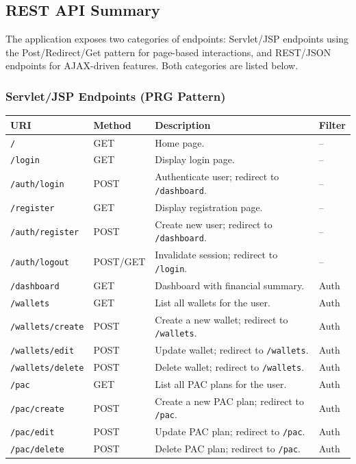 \subsection{REST API Summary}

The application exposes two categories of endpoints: Servlet/JSP endpoints using the Post/Redirect/Get pattern for page-based interactions, and REST/JSON endpoints for AJAX-driven features. Both categories are listed below.

\subsubsection*{Servlet/JSP Endpoints (PRG Pattern)}

\begin{longtable}{|p{}|p{} |p{}|p{}|}
\hline
\textbf{URI} & \textbf{Method} & \textbf{Description} & \textbf{Filter} \\\hline

\texttt{/} & GET & Home page. & -- \\\hline
\texttt{/login} & GET & Display login page. & -- \\\hline
\texttt{/auth/login} & POST & Authenticate user; redirect to \texttt{/dashboard}. & -- \\\hline
\texttt{/register} & GET & Display registration page. & -- \\\hline
\texttt{/auth/register} & POST & Create new user; redirect to \texttt{/dashboard}. & -- \\\hline
\texttt{/auth/logout} & POST/GET & Invalidate session; redirect to \texttt{/login}. & -- \\\hline

\texttt{/dashboard} & GET & Dashboard with financial summary. & Auth \\\hline

\texttt{/wallets} & GET & List all wallets for the user. & Auth \\\hline
\texttt{/wallets/create} & POST & Create a new wallet; redirect to \texttt{/wallets}. & Auth \\\hline
\texttt{/wallets/edit} & POST & Update wallet; redirect to \texttt{/wallets}. & Auth \\\hline
\texttt{/wallets/delete} & POST & Delete wallet; redirect to \texttt{/wallets}. & Auth \\\hline

\texttt{/pac} & GET & List all PAC plans for the user. & Auth \\\hline
\texttt{/pac/create} & POST & Create a new PAC plan; redirect to \texttt{/pac}. & Auth \\\hline
\texttt{/pac/edit} & POST & Update PAC plan; redirect to \texttt{/pac}. & Auth \\\hline
\texttt{/pac/delete} & POST & Delete PAC plan; redirect to \texttt{/pac}. & Auth \\\hline


\end{longtable}
